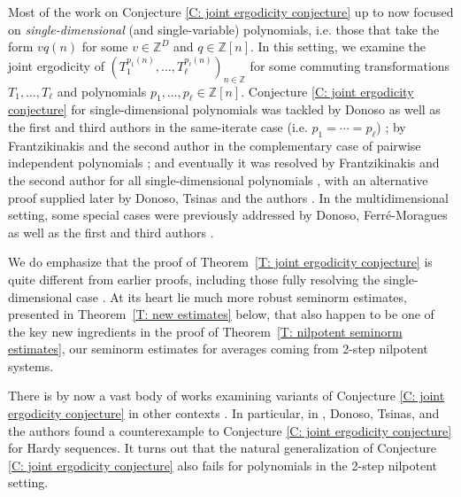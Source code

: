 \documentclass[11pt]{amsart}
\theoremstyle{definition}
\newcommand{\Z}{{\mathbb Z}}
\newcommand{\1}{{\mathbf{1}}}
\begin{document}
Most of the work on Conjecture \ref{C: joint ergodicity conjecture} up to now focused on \textit{single-dimensional} (and single-variable) polynomials, i.e. those that take the form $vq(n)$ for some $v\in \Z^D$ and $q\in\Z[n]$. In this setting, we examine the joint ergodicity of $(T_1^{p_1(n)}, \ldots, T_\ell^{p_\ell(n)})_{n\in\Z}$ for some commuting transformations $T_1, \ldots, T_\ell$ and polynomials $p_1, \ldots, p_\ell\in\Z[n]$. Conjecture \ref{C: joint ergodicity conjecture} for single-dimensional polynomials was tackled by Donoso as well as the first and third authors in the same-iterate case (i.e. $p_1 = \cdots = p_\ell$) \cite{DKS22}; by Frantzikinakis and the second author in the complementary case of pairwise independent polynomials \cite{FrKu22a}; and eventually it was resolved by Frantzikinakis and the second author for all single-dimensional polynomials \cite{FrKu22b}, with an alternative proof supplied later by Donoso, Tsinas and the authors \cite{DKKST25}. In the multidimensional setting, some special cases were previously addressed by Donoso, Ferr{\'e}-Moragues as well as the first and third authors \cite{DFKS22}.

We do emphasize that the proof of Theorem~\ref{T: joint ergodicity conjecture} is quite different from earlier proofs, including those fully resolving the single-dimensional case \cite{DKKST25, FrKu22b}. At its heart lie much more robust seminorm estimates, presented in Theorem~\ref{T: new estimates} below, that also happen to be one of the key new ingredients in the proof of Theorem~\ref{T: nilpotent seminorm estimates}, our seminorm estimates for averages coming from 2-step nilpotent systems.

There is by now a vast body of works examining variants of Conjecture \ref{C: joint ergodicity conjecture} in other contexts \cite{BLS16, BS23, DKKST25, DKKST24, DKS23, DKS24,  KoSu23}. In particular, in \cite{DKKST25}, Donoso, Tsinas, and the authors found a counterexample \cite[Theorem~1.10]{DKKST25} to Conjecture \ref{C: joint ergodicity conjecture} for Hardy sequences. It turns out that the natural generalization of Conjecture \ref{C: joint ergodicity conjecture} also fails for polynomials in the 2-step nilpotent setting.
\end{document}
